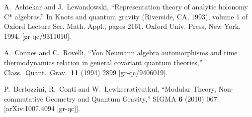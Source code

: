 \documentclass[12pt]{article}
\begin{document}
\begin{thebibliography}{99}
  A.~Ashtekar and J.~Lewandowski,
  ``Representation theory of analytic holonomy C* algebras.''
In Knots and quantum gravity (Riverside,
CA, 1993), volume 1 of Oxford Lecture Ser. Math. Appl., pages 2161.
Oxford Univ. Press, New York, 1994. 
  [gr-qc/9311010].







  A.~Connes and C.~Rovelli,
  ``Von Neumann algebra automorphisms and time thermodynamics relation in
  general covariant quantum theories,''
  Class.\ Quant.\ Grav.\  {\bf 11} (1994) 2899
  [gr-qc/9406019].




  P.~Bertozzini, R.~Conti and W.~Lewkeeratiyutkul,
  ``Modular Theory, Non-commutative Geometry and Quantum Gravity,''
  SIGMA {\bf 6} (2010) 067
  [arXiv:1007.4094 [gr-qc]].












\end{thebibliography}
\end{document}
